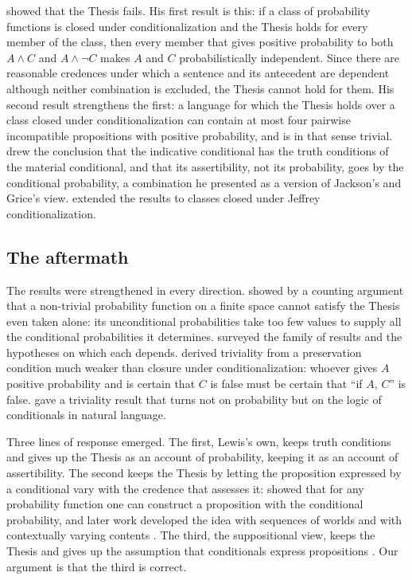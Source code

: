 \documentclass{situationist-preprint}
\begin{document}
\citet{Lewis1976} showed that the Thesis fails. His first result is this: if a class of probability functions is closed under conditionalization and the Thesis holds for every member of the class, then every member that gives positive probability to both $A \wedge C$ and $A \wedge \neg C$ makes $A$ and $C$ probabilistically independent. Since there are reasonable credences under which a sentence and its antecedent are dependent although neither combination is excluded, the Thesis cannot hold for them. His second result strengthens the first: a language for which the Thesis holds over a class closed under conditionalization can contain at most four pairwise incompatible propositions with positive probability, and is in that sense trivial. \citet{Lewis1976} drew the conclusion that the indicative conditional has the truth conditions of the material conditional, and that its assertibility, not its probability, goes by the conditional probability, a combination he presented as a version of Jackson's and Grice's view. \citet{Lewis1986} extended the results to classes closed under Jeffrey conditionalization.

\subsection{The aftermath}

The results were strengthened in every direction. \citet{Hajek1989} showed by a counting argument that a non-trivial probability function on a finite space cannot satisfy the Thesis even taken alone: its unconditional probabilities take too few values to supply all the conditional probabilities it determines. \citet{HajekHall1994} surveyed the family of results and the hypotheses on which each depends. \citet{Bradley2000} derived triviality from a preservation condition much weaker than closure under conditionalization: whoever gives $A$ positive probability and is certain that $C$ is false must be certain that \enquote{if $A$, $C$} is false. \citet{KhooMandelkern2019} gave a triviality result that turns not on probability but on the logic of conditionals in natural language.

Three lines of response emerged. The first, Lewis's own, keeps truth conditions and gives up the Thesis as an account of probability, keeping it as an account of assertibility. The second keeps the Thesis by letting the proposition expressed by a conditional vary with the credence that assesses it: \citet{vanFraassen1976} showed that for any probability function one can construct a proposition with the conditional probability, and later work developed the idea with sequences of worlds \citep{McGee1989,Kaufmann2004} and with contextually varying contents \citep{Bacon2015}. The third, the suppositional view, keeps the Thesis and gives up the assumption that conditionals express propositions \citep{Adams1975,Edgington1995,Bennett2003}. Our argument is that the third is correct.
\end{document}
